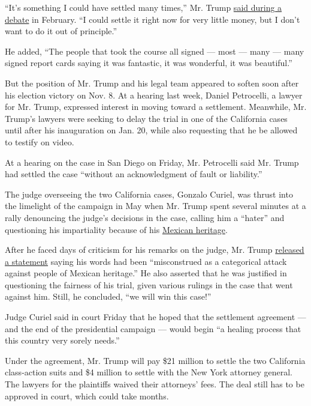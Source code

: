 ``It's something I could have settled many times,'' Mr. Trump
\href{http://www.nytimes.com/politics/first-draft/2016/02/26/conservative-group-to-air-ads-of-ex-students-complaining-about-trump-university/}{said
during a debate} in February. ``I could settle it right now for very
little money, but I don't want to do it out of principle.''

He added, ``The people that took the course all signed --- most --- many
--- many signed report cards saying it was fantastic, it was wonderful,
it was beautiful.''

But the position of Mr. Trump and his legal team appeared to soften soon
after his election victory on Nov. 8. At a hearing last week, Daniel
Petrocelli, a lawyer for Mr. Trump, expressed interest in moving toward
a settlement. Meanwhile, Mr. Trump's lawyers were seeking to delay the
trial in one of the California cases until after his inauguration on
Jan. 20, while also requesting that he be allowed to testify on video.

At a hearing on the case in San Diego on Friday, Mr. Petrocelli said Mr.
Trump had settled the case ``without an acknowledgment of fault or
liability.''

The judge overseeing the two California cases, Gonzalo Curiel, was
thrust into the limelight of the campaign in May when Mr. Trump spent
several minutes at a rally denouncing the judge's decisions in the case,
calling him a ``hater'' and questioning his impartiality because of his
\href{http://www.nytimes.com/2016/06/04/us/politics/donald-trump-university-judge-gonzalo-curiel.html}{Mexican
heritage}.

After he faced days of criticism for his remarks on the judge, Mr. Trump
\href{https://www.donaldjtrump.com/press-releases/donald-j.-trump-statement-regarding-trump-university}{released
a statement} saying his words had been ``misconstrued as a categorical
attack against people of Mexican heritage.'' He also asserted that he
was justified in questioning the fairness of his trial, given various
rulings in the case that went against him. Still, he concluded, ``we
will win this case!''

Judge Curiel said in court Friday that he hoped that the settlement
agreement --- and the end of the presidential campaign --- would begin
``a healing process that this country very sorely needs.''

Under the agreement, Mr. Trump will pay \$21 million to settle the two
California class-action suits and \$4 million to settle with the New
York attorney general. The lawyers for the plaintiffs waived their
attorneys' fees. The deal still has to be approved in court, which could
take months.

